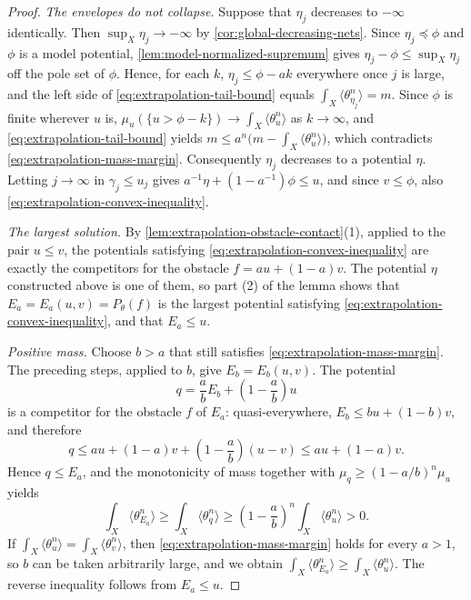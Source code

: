 \begin{proof}
\emph{The envelopes do not collapse.} Suppose that $\eta_j$ decreases to $-\infty$ identically. Then $\sup_X\eta_j\to-\infty$ by \cref{cor:global-decreasing-nets}. Since $\eta_j\preceq\phi$ and $\phi$ is a model potential, \cref{lem:model-normalized-supremum} gives $\eta_j-\phi\leq\sup_X\eta_j$ off the pole set of $\phi$. Hence, for each $k$, $\eta_j\leq\phi-ak$ everywhere once $j$ is large, and the left side of \eqref{eq:extrapolation-tail-bound} equals $\int_X\langle\theta_{\eta_j}^n\rangle=m$. Since $\phi$ is finite wherever $u$ is, $\mu_u(\{u>\phi-k\})\to\int_X\langle\theta_u^n\rangle$ as $k\to\infty$, and \eqref{eq:extrapolation-tail-bound} yields $m\leq a^n\bigl(m-\int_X\langle\theta_u^n\rangle\bigr)$, which contradicts \eqref{eq:extrapolation-mass-margin}. Consequently $\eta_j$ decreases to a potential $\eta$. Letting $j\to\infty$ in $\gamma_j\leq u_j$ gives $a^{-1}\eta+(1-a^{-1})\phi\leq u$, and since $v\leq\phi$, also \eqref{eq:extrapolation-convex-inequality}.

\emph{The largest solution.} By \cref{lem:extrapolation-obstacle-contact}(1), applied to the pair $u\leq v$, the potentials satisfying \eqref{eq:extrapolation-convex-inequality} are exactly the competitors for the obstacle $f=au+(1-a)v$. The potential $\eta$ constructed above is one of them, so part (2) of the lemma shows that $E_a=E_a(u,v)=P_\theta(f)$ is the largest potential satisfying \eqref{eq:extrapolation-convex-inequality}, and that $E_a\leq u$.

\emph{Positive mass.} Choose $b>a$ that still satisfies \eqref{eq:extrapolation-mass-margin}. The preceding steps, applied to $b$, give $E_b=E_b(u,v)$. The potential
\[
 q=\frac abE_b+\left(1-\frac ab\right)u
\]
is a competitor for the obstacle $f$ of $E_a$: quasi-everywhere, $E_b\leq bu+(1-b)v$, and therefore
\[
 q\leq au+(1-a)v+\left(1-\frac ab\right)(u-v)\leq au+(1-a)v.
\]
Hence $q\leq E_a$, and the monotonicity of mass together with $\mu_q\geq(1-a/b)^n\mu_u$ yields
\[
 \int_X\langle\theta_{E_a}^n\rangle\geq\int_X\langle\theta_q^n\rangle\geq\left(1-\frac ab\right)^n\int_X\langle\theta_u^n\rangle>0.
\]
If $\int_X\langle\theta_u^n\rangle=\int_X\langle\theta_v^n\rangle$, then \eqref{eq:extrapolation-mass-margin} holds for every $a>1$, so $b$ can be taken arbitrarily large, and we obtain $\int_X\langle\theta_{E_a}^n\rangle\geq\int_X\langle\theta_u^n\rangle$. The reverse inequality follows from $E_a\leq u$.
\end{proof}


